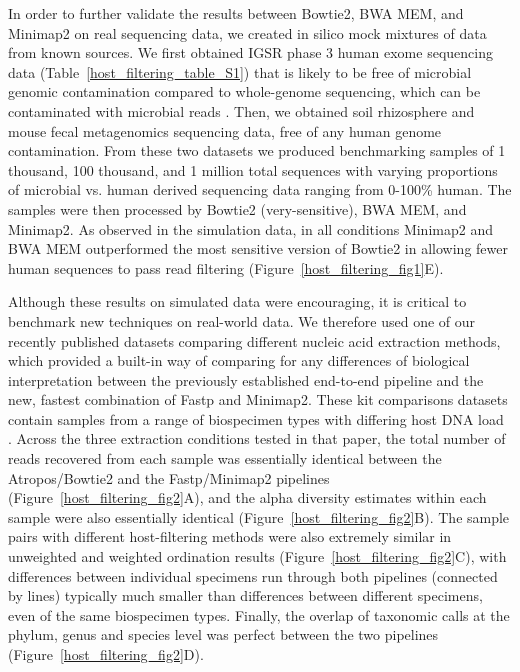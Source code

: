 In order to further validate the results between Bowtie2, BWA MEM, and Minimap2 on real sequencing data, we created in silico mock mixtures of data from known sources.  We first obtained IGSR phase 3 \cite{Clarke2017-qi} human exome sequencing data (Table~\ref{host_filtering_table_S1}) that is likely to be free of microbial genomic contamination compared to whole-genome sequencing, which can be contaminated with microbial reads \cite{Poore2020-yh}.  Then, we obtained soil rhizosphere and mouse fecal metagenomics sequencing data, free of any human genome contamination. From these two datasets we produced benchmarking samples of 1 thousand, 100 thousand, and 1 million total sequences with varying proportions of microbial vs. human derived sequencing data ranging from 0-100\% human. The samples were then processed by Bowtie2 (very-sensitive), BWA MEM, and Minimap2. As observed in the simulation data, in all conditions Minimap2 and BWA MEM outperformed the most sensitive version of Bowtie2 in allowing fewer human sequences to pass read filtering (Figure~\ref{host_filtering_fig1}E).

Although these results on simulated data were encouraging, it is critical to benchmark new techniques on real-world data. We therefore used one of our recently published datasets comparing different nucleic acid extraction methods, which provided a built-in way of comparing for any differences of biological interpretation between the previously established end-to-end pipeline and the new, fastest combination of Fastp and Minimap2. These kit comparisons datasets contain samples from  a range of biospecimen types with differing host DNA load \cite{Shaffer2021-mf}. Across the three extraction conditions tested in that paper, the total number of reads recovered from each sample was essentially identical between the Atropos/Bowtie2 and the Fastp/Minimap2 pipelines (Figure~\ref{host_filtering_fig2}A), and the alpha diversity estimates within each sample were also essentially identical (Figure~\ref{host_filtering_fig2}B). The sample pairs with different host-filtering methods were also extremely similar in unweighted and weighted ordination results (Figure~\ref{host_filtering_fig2}C), with differences between individual specimens run through both pipelines (connected by lines) typically much smaller than differences between different specimens, even of the same biospecimen types. Finally, the overlap of taxonomic calls at the phylum, genus and species level was perfect between the two pipelines (Figure~\ref{host_filtering_fig2}D).

